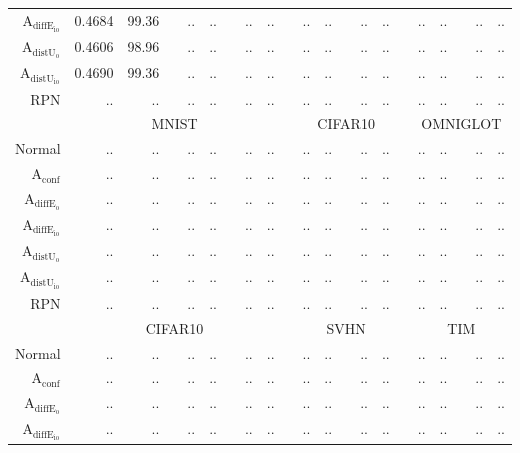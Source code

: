 \begin{table}[ht]
\begin{tiny}
\begin{tabular}{@{}rrrcrrcrrcrrcrrcrrcrr@{}}
			$\mathrm{A}_{\mathrm{diffE_{io}}}$ & 0.4684 & 99.36 & & .. & .. & & .. & .. & & .. & .. & & .. & .. & & .. & .. & & .. & .. \\
			$\mathrm{A}_{\mathrm{distU_{o}}}$  & 0.4606 & 98.96 & & .. & .. & & .. & .. & & .. & .. & & .. & .. & & .. & .. & & .. & .. \\
			$\mathrm{A}_{\mathrm{distU_{io}}}$ & 0.4690 & 99.36 & & .. & .. & & .. & .. & & .. & .. & & .. & .. & & .. & .. & & .. & .. \\
			RPN                                & .. & .. & & .. & .. & & .. & .. & & .. & .. & & .. & .. & & .. & .. & & .. & .. \\
			\midrule
			& \multicolumn{8}{c}{MNIST} & & \multicolumn{5}{c}{CIFAR10} & & \multicolumn{5}{c}{OMNIGLOT} \\
			Normal                             & .. & .. & & .. & .. & & .. & .. & & .. & .. & & .. & .. & & .. & .. & & .. & .. \\
			$\mathrm{A}_{\mathrm{conf}}$       & .. & .. & & .. & .. & & .. & .. & & .. & .. & & .. & .. & & .. & .. & & .. & .. \\
			$\mathrm{A}_{\mathrm{diffE_{o}}}$  & .. & .. & & .. & .. & & .. & .. & & .. & .. & & .. & .. & & .. & .. & & .. & .. \\
			$\mathrm{A}_{\mathrm{diffE_{io}}}$ & .. & .. & & .. & .. & & .. & .. & & .. & .. & & .. & .. & & .. & .. & & .. & .. \\
			$\mathrm{A}_{\mathrm{distU_{o}}}$  & .. & .. & & .. & .. & & .. & .. & & .. & .. & & .. & .. & & .. & .. & & .. & .. \\
			$\mathrm{A}_{\mathrm{distU_{io}}}$ & .. & .. & & .. & .. & & .. & .. & & .. & .. & & .. & .. & & .. & .. & & .. & .. \\
			RPN                                & .. & .. & & .. & .. & & .. & .. & & .. & .. & & .. & .. & & .. & .. & & .. & .. \\
			\midrule
			& \multicolumn{8}{c}{CIFAR10} & & \multicolumn{5}{c}{SVHN} & & \multicolumn{5}{c}{TIM} \\
			Normal                             & .. & .. & & .. & .. & & .. & .. & & .. & .. & & .. & .. & & .. & .. & & .. & .. \\
			$\mathrm{A}_{\mathrm{conf}}$       & .. & .. & & .. & .. & & .. & .. & & .. & .. & & .. & .. & & .. & .. & & .. & .. \\
			$\mathrm{A}_{\mathrm{diffE_{o}}}$  & .. & .. & & .. & .. & & .. & .. & & .. & .. & & .. & .. & & .. & .. & & .. & .. \\
			$\mathrm{A}_{\mathrm{diffE_{io}}}$ & .. & .. & & .. & .. & & .. & .. & & .. & .. & & .. & .. & & .. & .. & & .. & .. \\

\end{tabular}
\end{tiny}
\end{table}
